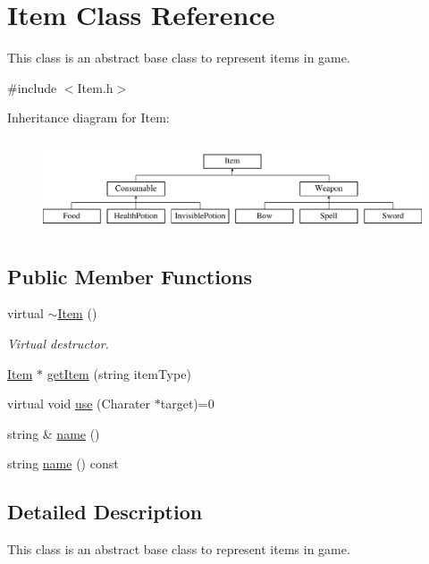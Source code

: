 \hypertarget{classItem}{\section{Item Class Reference}
\label{classItem}
}


This class is an abstract base class to represent items in game.  




{\ttfamily \#include $<$Item.\-h$>$}

Inheritance diagram for Item\-:\begin{figure}[H]
\begin{center}
\leavevmode
\includegraphics[height=2.772277cm]{classItem}
\end{center}
\end{figure}
\subsection*{Public Member Functions}
\begin{DoxyCompactItemize}
\item 
\hypertarget{classItem_a33cc9c0bc556b5a33a9d0d58d37c602b}{virtual \hyperlink{classItem_a33cc9c0bc556b5a33a9d0d58d37c602b}{$\sim$\-Item} ()}\label{classItem_a33cc9c0bc556b5a33a9d0d58d37c602b}

\begin{DoxyCompactList}\small\item\em Virtual destructor. \end{DoxyCompactList}\item 
\hyperlink{classItem}{Item} $\ast$ \hyperlink{classItem_ae2398e06c05c81df420d4ce92cd69a80}{get\-Item} (string item\-Type)
\item 
virtual void \hyperlink{classItem_a6905855bea19d5f5ccc098cf39dc147f}{use} (Charater $\ast$target)=0
\item 
string \& \hyperlink{classItem_aeae73c8d4d4364d62a4984c85d1d2a3b}{name} ()
\item 
string \hyperlink{classItem_aefdaa767e00c0fcfe2801a5e3e4e951d}{name} () const 
\end{DoxyCompactItemize}


\subsection{Detailed Description}
This class is an abstract base class to represent items in game. 

